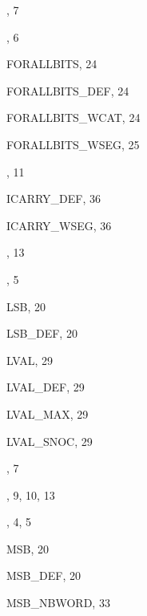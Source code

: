 \begin{theindex}
  \indexspace

  \item {}, 7
  \item {}, 6
  \item {\ptt FORALLBITS}, 24
  \item {\ptt FORALLBITS\_DEF}, 24
  \item {\ptt FORALLBITS\_WCAT}, 24
  \item {\ptt FORALLBITS\_WSEG}, 25

  \indexspace

  \item {}, 11
  \item {\ptt ICARRY\_DEF}, 36
  \item {\ptt ICARRY\_WSEG}, 36
  \item {}, 13

  \indexspace

  \item {}, 5
  \item {\ptt LSB}, 20
  \item {\ptt LSB\_DEF}, 20
  \item {\ptt LVAL}, 29
  \item {\ptt LVAL\_DEF}, 29
  \item {\ptt LVAL\_MAX}, 29
  \item {\ptt LVAL\_SNOC}, 29

  \indexspace

  \item {}, 7
  \item {}, 9, 10, 13
  \item {}, 4, 5
  \item {\ptt MSB}, 20
  \item {\ptt MSB\_DEF}, 20
  \item {\ptt MSB\_NBWORD}, 33

  \indexspace


\end{theindex}

